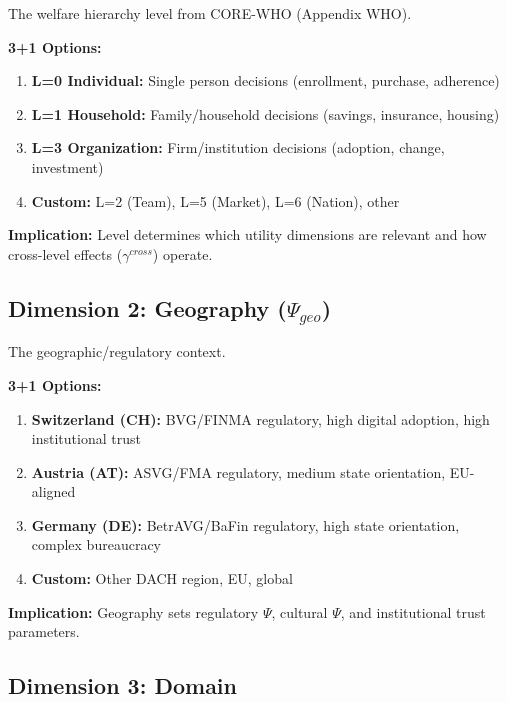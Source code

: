 The welfare hierarchy level from CORE-WHO (Appendix WHO).

\begin{tcolorbox}[colback=white, colframe=black,
    title=Dimension 1: Level Selection]
\textbf{3+1 Options:}
\begin{enumerate}
\item[$\square$] \textbf{L=0 Individual:} Single person decisions (enrollment, purchase, adherence)
\item[$\square$] \textbf{L=1 Household:} Family/household decisions (savings, insurance, housing)
\item[$\square$] \textbf{L=3 Organization:} Firm/institution decisions (adoption, change, investment)
\item[$\square$] \textbf{Custom:} L=2 (Team), L=5 (Market), L=6 (Nation), other
\end{enumerate}

\textbf{Implication:} Level determines which utility dimensions are relevant and
how cross-level effects ($\gamma^{cross}$) operate.
\end{tcolorbox}

\subsection{Dimension 2: Geography ($\Psi_{geo}$)}

The geographic/regulatory context.

\begin{tcolorbox}[colback=white, colframe=black,
    title=Dimension 2: Geography Selection]
\textbf{3+1 Options:}
\begin{enumerate}
\item[$\square$] \textbf{Switzerland (CH):} BVG/FINMA regulatory, high digital adoption, high institutional trust
\item[$\square$] \textbf{Austria (AT):} ASVG/FMA regulatory, medium state orientation, EU-aligned
\item[$\square$] \textbf{Germany (DE):} BetrAVG/BaFin regulatory, high state orientation, complex bureaucracy
\item[$\square$] \textbf{Custom:} Other DACH region, EU, global
\end{enumerate}

\textbf{Implication:} Geography sets regulatory $\Psi$, cultural $\Psi$, and
institutional trust parameters.
\end{tcolorbox}

\subsection{Dimension 3: Domain}

